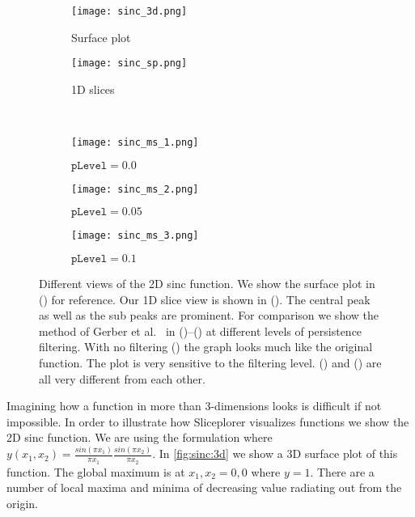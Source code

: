 \begin{figure}
  \centering
  \begin{subfigure}[b]{0.3\linewidth}
    \texttt{[image: sinc\_3d.png]}
    \caption{
      Surface plot
    }
    \label{fig:sinc:3d}
  \end{subfigure}
  \qquad\qquad%
  \begin{subfigure}[b]{0.3\linewidth}
    \texttt{[image: sinc\_sp.png]}
    \caption{
      1D slices
    }
    \label{fig:sinc:sp}
  \end{subfigure}
  \\
  \begin{subfigure}[b]{0.3\linewidth}
    \texttt{[image: sinc\_ms\_1.png]}
    \caption{
      $\texttt{pLevel} = 0.0$
    }
    \label{fig:sinc:ms_1}
  \end{subfigure}
  \hfill
  \begin{subfigure}[b]{0.3\linewidth}
    \texttt{[image: sinc\_ms\_2.png]}
    \caption{
      $\texttt{pLevel} = 0.05$
    }
    \label{fig:sinc:ms_2}
  \end{subfigure}
  \hfill
  \begin{subfigure}[b]{0.3\linewidth}
    \texttt{[image: sinc\_ms\_3.png]}
    \caption{
      $\texttt{pLevel} = 0.1$
    }
    \label{fig:sinc:ms_3}
  \end{subfigure}
  \caption{
    Different views of the 2D sinc function. We show the surface plot
    in () for reference. Our 1D slice view is shown
    in (). The central peak as well as the sub peaks
    are prominent. For comparison we show the method of Gerber et 
    al.~\cite{Gerber:2010} in 
    ()--() at different levels 
    of persistence filtering. 
    With no filtering () the graph looks much like the
    original function. The plot is very sensitive to the filtering level.
    () and () are all very 
    different from each other.
  }
  \label{fig:sinc}
\end{figure}

Imagining how a function in more than 3-dimensions looks is difficult if not
impossible. In order to illustrate how Sliceplorer visualizes functions we show
the 2D sinc function. 
We are using the formulation where 
$y(x_1,x_2) = \frac{sin(\pi x_1)}{\pi x_1} \frac{sin(\pi x_2)}{\pi x_2}$.
In \autoref{fig:sinc:3d} we show a 3D surface plot of this function. The 
global maximum is at $x_1,x_2 = 0,0$ where $y=1$. There are a number of local
maxima and minima of decreasing value radiating out from the origin.

